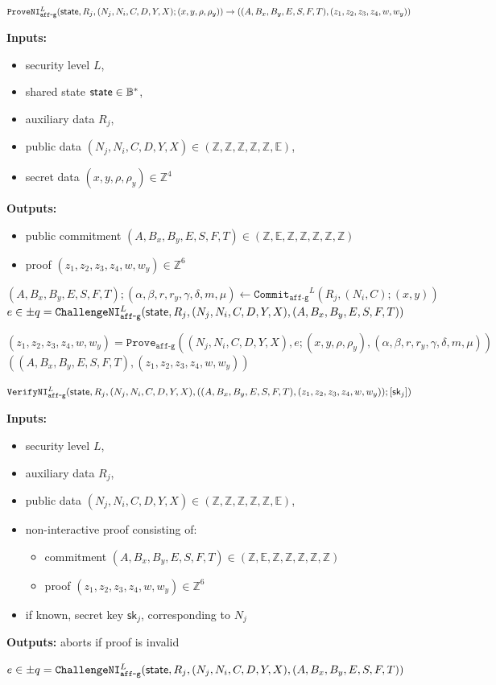 \documentclass[11pt]{article}
\newenvironment{inlineAlgorithm}{}{}
\newcommand{\algoName}[1]{#1 \par}
\newcommand{\algoInputsList}[1]{
    {\small \bf Inputs:} 
        \begin{itemize}[noitemsep,topsep=0pt]
            #1
        \end{itemize}
}
\newcommand{\algoOutputs}[1]{
    {\small \bf Outputs:} #1 \par
}
\newcommand{\algoOutputsList}[1]{
    {\small \bf Outputs:}
        \begin{itemize}[noitemsep,topsep=0pt]
            #1
        \end{itemize}
}
\def\state{{\sf state}}
\newcommand{\commit}[1]{\ensuremath{\mathtt{Commit}_{\mathtt{#1}}}}
\newcommand{\challengeni}[1]{\ensuremath{\mathtt{ChallengeNI}_{\mathtt{#1}}}}
\newcommand{\prove}[1]{\ensuremath{\mathtt{Prove}_{\mathtt{#1}}}}
\newcommand{\proveni}[1]{\ensuremath{\mathtt{ProveNI}_{\mathtt{#1}}}}
\newcommand{\verifyni}[1]{\ensuremath{\mathtt{VerifyNI}_{\mathtt{#1}}}}
\newcommand{\sk}{\textsf{sk}}
\newcommand{\E}{\mathbb{E}}
\newcommand{\Z}{\mathbb{Z}}
\newcommand{\?}[1]{\stackrel{?}{#1}}
\newcommand{\Byte}{\ensuremath{\mathbb{B}}}
\begin{document}
\begin{description}

\item
\begin{inlineAlgorithm}
\algoName{$\proveni{aff\mbox{-}g}^L(
    \state,
    R_j,
    (N_j, N_i, C, D, Y, X);
    (x, y, \rho, \rho_y)
) \to (
    (A, B_x, B_y, E, S, F, T),
    (z_1, z_2, z_3, z_4, w, w_y)
)$}
\algoInputsList{
    \item security level $L$,
    \item shared state $\state \in \Byte^*$,
    \item auxiliary data $R_j$,
    \item public data $(N_j, N_i, C, D, Y, X) \in (\Z, \Z, \Z, \Z, \Z, \E)$,
    \item secret data $(x, y, \rho, \rho_y) \in \Z^4$
}
\algoOutputsList{
    \item public commitment $(A, B_x, B_y, E, S, F, T) \in (\Z, \E, \Z, \Z, \Z, \Z, \Z)$
    \item proof $(z_1, z_2, z_3, z_4, w, w_y) \in \Z^6$
}
\begin{algorithmic}[1]
\State $(A, B_x, B_y, E, S, F, T);
        (\alpha, \beta, r, r_y, \gamma, \delta, m, \mu)
        \gets \commit{aff\mbox{-}g}^L(R_j, (N_i, C); (x, y))$
\State $e \in \pm q = \challengeni{aff\mbox{-}g}^L(
    \state,
    R_j,
    (N_j, N_i, C, D, Y, X),
    (A, B_x, B_y, E, S, F, T)
)$

\Comment{$q = |\E|$}
\State $(z_1, z_2, z_3, z_4, w, w_y) = \prove{aff\mbox{-}g}(
    (N_j, N_i, C, D, Y, X),
    e;
    (x, y, \rho, \rho_y),
    (\alpha, \beta, r, r_y, \gamma, \delta, m, \mu)
)$
\State \Return $(
    (A, B_x, B_y, E, S, F, T),
    (z_1, z_2, z_3, z_4, w, w_y)
)$
\end{algorithmic}
\end{inlineAlgorithm}

\item
\begin{inlineAlgorithm}
\algoName{$\verifyni{aff\mbox{-}g}^L(
    \state,
    R_j,
    (N_j, N_i, C, D, Y, X),
    (
        (A, B_x, B_y, E, S, F, T),
        (z_1, z_2, z_3, z_4, w, w_y)
    );
    [\sk_j]
)$}
\algoInputsList{
    \item security level $L$,
    \item auxiliary data $R_j$,
    \item public data $(N_j, N_i, C, D, Y, X) \in (\Z, \Z, \Z, \Z, \Z, \E)$,
    \item non-interactive proof consisting of:
        \begin{itemize}
        \item commitment $(A, B_x, B_y, E, S, F, T) \in (\Z, \E, \Z, \Z, \Z, \Z, \Z)$
        \item proof $(z_1, z_2, z_3, z_4, w, w_y) \in \Z^6$
        \end{itemize}
    \item if known, secret key $\sk_j$, corresponding to $N_j$
}
\algoOutputs{aborts if proof is invalid}
\begin{algorithmic}[1]
\State $e \in \pm q = \challengeni{aff\mbox{-}g}^L(
    \state,
    R_j,
    (N_j, N_i, C, D, Y, X),
    (A, B_x, B_y, E, S, F, T)
)$


\end{algorithmic}
\end{inlineAlgorithm}
\end{description}
\end{document}
